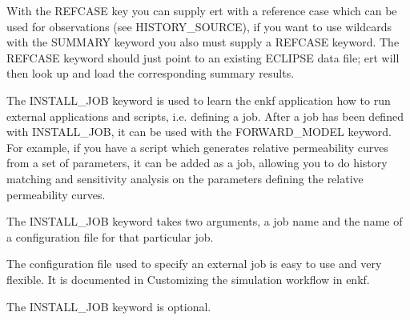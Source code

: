 \documentclass[a4paper,10pt,english]{sphinxmanual}
\begin{document}
\label{\detokenize{keywords/index:refcase}}
\begin{sphinxShadowBox}

With the REFCASE key you can supply ert with a reference case which can be
used for observations (see HISTORY\_SOURCE), if you want to use wildcards with
the SUMMARY keyword you also must supply a REFCASE keyword. The REFCASE
keyword should just point to an existing ECLIPSE data file; ert will then look
up and load the corresponding summary results.


%
\begin{sphinxVerbatim}[commandchars=\\\{\}]
            
 
\end{sphinxVerbatim}
\end{sphinxShadowBox}
\label{\detokenize{keywords/index:install-job}}
\begin{sphinxShadowBox}

The INSTALL\_JOB keyword is used to learn the enkf application how to run
external applications and scripts, i.e. defining a job. After a job has been
defined with INSTALL\_JOB, it can be used with the FORWARD\_MODEL keyword. For
example, if you have a script which generates relative permeability curves
from a set of parameters, it can be added as a job, allowing you to do history
matching and sensitivity analysis on the parameters defining the relative
permeability curves.

The INSTALL\_JOB keyword takes two arguments, a job name and the name of a
configuration file for that particular job.


%
\begin{sphinxVerbatim}[commandchars=\\\{\}]
      
      
    
  
\end{sphinxVerbatim}

The configuration file used to specify an external job is easy to use and very
flexible. It is documented in Customizing the simulation workflow in enkf.

The INSTALL\_JOB keyword is optional.
\end{sphinxShadowBox}
\end{document}
